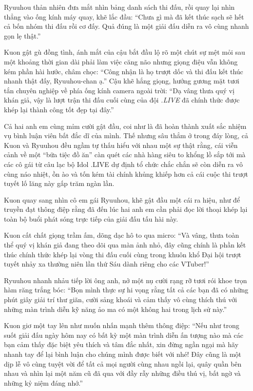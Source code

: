 \documentclass[../main.tex]{subfiles}
\begin{document}

Ryuuhou thản nhiên đưa mắt nhìn bảng danh sách thi đấu, rồi quay lại nhìn thẳng vào ống kính máy quay, khẽ lắc đầu: ``Chưa gì mà đã kết thúc sạch sẽ hết cả bốn nhóm thi đấu rồi cơ đấy. Quả đúng là một giải đấu diễn ra vô cùng nhanh gọn lẹ thật.''

Kuon gật gù đồng tình, ánh mắt của cậu bắt đầu lộ rõ một chút sự mệt mỏi sau một khoảng thời gian dài phải làm việc căng não nhưng giọng điệu vẫn không kém phần hài hước, châm chọc: ``Công nhận là họ trượt dốc và thi đấu kết thúc nhanh thật đấy, Ryuuhou-chan ạ.'' Cậu khẽ hắng giọng, hướng gương mặt tươi tắn chuyên nghiệp về phía ống kính camera ngoài trời: ``Dạ vâng thưa quý vị khán giả, vậy là lượt trận thi đấu cuối cùng của đội \textit{.LIVE} đã chính thức được khép lại thành công tốt đẹp tại đây.''

Cả hai anh em cùng mỉm cười gật đầu, coi như là đã hoàn thành xuất sắc nhiệm vụ bình luận viên bất đắc dĩ của mình. Thế nhưng sâu thẳm ở trong đáy lòng, cả Kuon và Ryuuhou đều ngầm tự thấu hiểu với nhau một sự thật rằng, cái viễn cảnh về một ``bữa tiệc đồ ăn'' càn quét các nhà hàng siêu to khổng lồ sắp tới mà các cô gái từ câu lạc bộ Idol .LIVE dự định tổ chức chắc chắn sẽ còn diễn ra vô cùng náo nhiệt, ồn ào và tốn kém tài chính khủng khiếp hơn cả cái cuộc thi trượt tuyết lố lăng này gấp trăm ngàn lần.

Kuon quay sang nhìn cô em gái Ryuuhou, khẽ gật đầu một cái ra hiệu, như để truyền đạt thông điệp rằng đã đến lúc hai anh em cần phải đọc lời thoại khép lại toàn bộ buổi phát sóng trực tiếp của giải đấu tấu hài này.

Kuon cất chất giọng trầm ấm, dõng dạc hô to qua micro: ``Và vâng, thưa toàn thể quý vị khán giả đang theo dõi qua màn ảnh nhỏ, đây cũng chính là phần kết thúc chính thức khép lại vòng thi đấu cuối cùng trong khuôn khổ Đại hội trượt tuyết nhảy xa thường niên lần thứ Sáu dành riêng cho các VTuber!''

Ryuuhou nhanh nhảu tiếp lời ông anh, nở một nụ cười rạng rỡ tươi rói khoe trọn hàm răng trắng bóc: ``Bọn mình thực sự hi vọng rằng tất cả các bạn đã có những phút giây giải trí thư giãn, cười sảng khoái và cảm thấy vô cùng thích thú với những màn trình diễn kỹ năng ảo ma có một không hai trong lịch sử này.''

Kuon giơ một tay lên như muốn nhấn mạnh thêm thông điệp: ``Nếu như trong suốt giải đấu ngày hôm nay có bất kỳ một màn trình diễn ấn tượng nào mà các bạn cảm thấy đặc biệt yêu thích và tâm đắc nhất, xin đừng ngần ngại mà hãy nhanh tay để lại bình luận cho chúng mình được biết với nhé! Đây cũng là một dịp lễ vô cùng tuyệt vời để tất cả mọi người cùng nhau ngồi lại, quây quần bên nhau và nhìn lại một năm cũ đã qua với đầy rẫy những điều thú vị, bất ngờ và những kỷ niệm đáng nhớ.''
\end{document}
